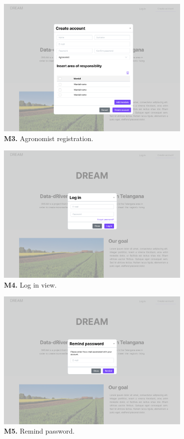 \begin{figure}[H]
    \centering
    \includegraphics[width=0.85\textwidth]{mockups/Unreg. user_Create account_Agronomist.png}
    \caption{\textbf{M3.} Agronomist registration.}
\end{figure}

\begin{figure}[H]
    \centering
    \includegraphics[width=0.85\textwidth]{mockups/Unreg. user_Log in.png}
    \caption{\textbf{M4.} Log in view.}
\end{figure}

\begin{figure}[H]
    \centering
    \includegraphics[width=0.85\textwidth]{mockups/Unreg. user_Remind password.png}
    \caption{\textbf{M5.} Remind password.}
\end{figure}


